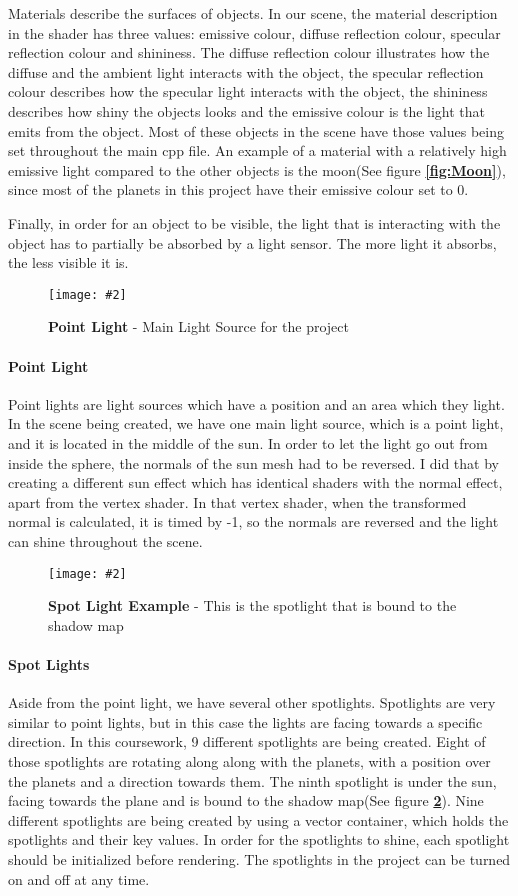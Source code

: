 \documentclass[10pt, a4paper]{article}
\newcommand{\figuremacro}[5]{
    \begin{figure}[#1]
        \centering
        \texttt{[image: \#2]}
        \caption[#3]{\textbf{#3}#4}
        \label{fig:#2}
    \end{figure}
}
\begin{document}
	
	Materials describe the surfaces of objects. In our scene, the material description in the shader has three values: emissive colour, diffuse reflection colour, specular reflection colour and shininess. The diffuse reflection colour illustrates how the diffuse and the ambient light interacts with the object, the specular reflection colour describes how the specular light interacts with the object, the shininess describes how shiny the objects looks and the emissive colour is the light that emits from the object. Most of these objects in the scene have those values being set throughout the main cpp file. An example of a material with a relatively high emissive light compared to the other objects is the moon(See figure \textbf{\ref{fig:Moon}}), since most of the planets in this project have their emissive colour set to 0.
	
	Finally, in order for an object to be visible, the light that is interacting with the object has to partially be absorbed by a light sensor. The more light it absorbs, the less visible it is.
	
	
	\figuremacro{H}{Sun}{Point Light}{ - Main Light Source for the project}{1.0}
	
	\paragraph{Point Light}  Point lights are light sources which have a position and an area which they light. In the scene being created, we have one main light source, which is a point light, and it is located in the middle of the sun. In order to let the light go out from inside the sphere, the normals of the sun mesh had to be reversed. I did that by creating a different sun effect which has identical shaders with the normal effect, apart from the vertex shader. In that vertex shader, when the transformed normal is calculated, it is timed by -1, so the normals are reversed and the light can shine throughout the scene.
	
	\figuremacro{H}{Spotlight_Shadow}{Spot Light Example}{ - This is the spotlight that is bound to the shadow map}{1.0}
	
	\paragraph{Spot Lights} Aside from the point light, we have several other spotlights. Spotlights are very similar to point lights, but in this case the lights are facing towards a specific direction. In this coursework, 9 different spotlights are being created. Eight of those spotlights are rotating along along with the planets, with a position over the planets and a direction towards them. The ninth spotlight is under the sun, facing towards the plane and is bound to the shadow map(See figure \textbf{\ref{fig:Spotlight_Shadow}}). Nine different spotlights are being created by using a vector container, which holds the spotlights and their key values. In order for the spotlights to shine, each spotlight should be initialized before rendering. The spotlights in the project can be turned on and off at any time.
	
\end{document}
